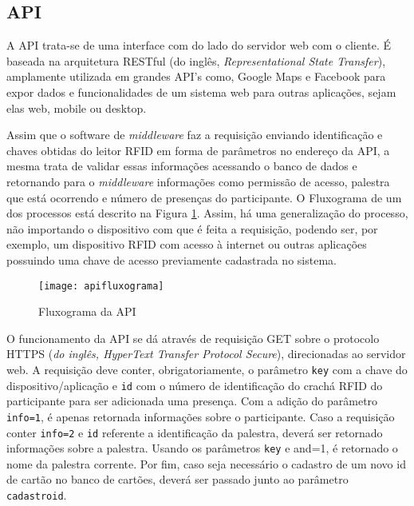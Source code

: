 \documentclass[tcc,capa]{texufpel}
\begin{document}
        \subsection{API}
        
            A API trata-se de uma interface com do lado do servidor web com o cliente. É baseada na arquitetura RESTful (do inglês, \textit{Representational State Transfer}), amplamente utilizada em grandes API's como, Google Maps e Facebook para expor dados e funcionalidades de um sistema web para outras aplicações, sejam elas web, mobile ou desktop.
            
            Assim que o software de \textit{middleware} faz a requisição enviando identificação e chaves obtidas do leitor RFID em forma de parâmetros no endereço da API, a mesma trata de validar essas informações acessando o banco de dados e retornando para o \textit{middleware} informações como  permissão de acesso, palestra que está ocorrendo e número de presenças do participante. O Fluxograma de um dos processos está descrito na Figura \ref{fluxoapi}.
            Assim, há uma generalização do processo, não importando o dispositivo com que é feita a requisição, podendo ser, por exemplo, um dispositivo RFID com acesso à internet ou outras aplicações possuindo uma chave de acesso previamente cadastrada no sistema.
            
            
            \begin{figure}[H]
                \centering \texttt{[image: apifluxograma]}
                \caption{Fluxograma da API}
                \label{fluxoapi}
            \end{figure}
            
            
            O funcionamento da API se dá através de requisição GET sobre o protocolo HTTPS (\textit{do inglês, HyperText Transfer Protocol Secure}), direcionadas ao servidor web. A requisição deve conter, obrigatoriamente, o parâmetro \texttt{key} com a chave do dispositivo/aplicação e \texttt{id} com o número de identificação do crachá RFID do participante para ser adicionada uma presença. Com a adição do parâmetro \texttt{info=1}, é apenas retornada informações sobre o participante.  Caso a requisição conter  \texttt{info=2} e \texttt{id} referente a identificação da palestra, deverá ser retornado informações sobre a palestra. Usando os parâmetros \texttt{key} e {and=1}, é retornado o nome da palestra corrente. Por fim, caso seja necessário o cadastro de um novo id de cartão no banco de cartões, deverá ser passado junto ao parâmetro \texttt{cadastroid}.
            
\end{document}
